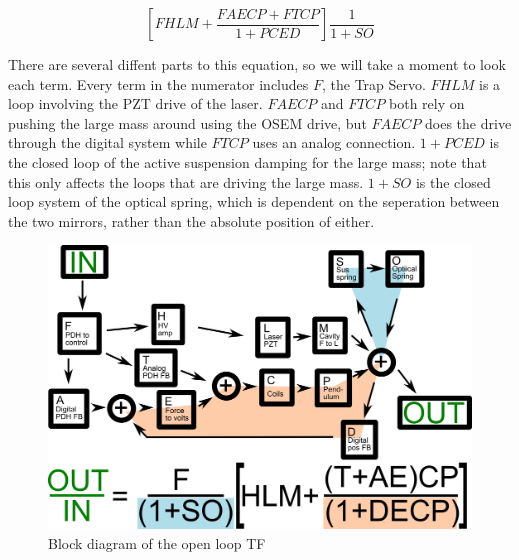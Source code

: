 
\begin{equation}
\left[FHLM+\frac{FAECP+FTCP}{1+PCED}\right]\frac{1}{1+SO}
\label{eq:loop}
\end{equation}

There are several diffent parts to this equation, so we will take a moment to look each term.  Every term in the numerator includes $F$, the Trap Servo. $FHLM$ is a loop involving the PZT drive of the laser.  $FAECP$ and $FTCP$ both rely on pushing the large mass around using the OSEM drive, but $FAECP$ does the drive through the digital system while $FTCP$ uses an analog connection. $1+PCED$ is the closed loop of the active suspension damping for the large mass; note that this only affects the loops that are driving the large mass. $1+SO$ is the closed loop system of the optical spring, which is dependent on the seperation between the two mirrors, rather than the absolute position of either.




\begin{figure}[htp]
\includegraphics[width=\columnwidth]{figures/controls/blocks.png}%
\caption{Block diagram of the open loop TF}%
\label{fig:blocks}%
\end{figure}

